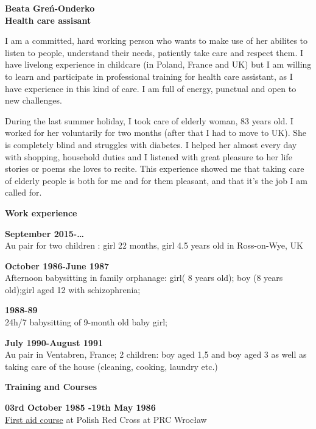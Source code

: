 \documentclass[a4paper,12pt,final]{memoir}
\newcommand{\SmallSep}{\vspace{0.5em}}
\newenvironment{Career Profile}
	{\ignorespaces\textbf{\color{ForestGreen} Career Profile}}
	{\Sep\ignorespacesafterend}
\newenvironment{Key experience}
	{\ignorespaces\textbf{\color{ForestGreen} Key experience}}
	{\Sep\ignorespacesafterend}
\newcommand{\CVSection}[1]
	{\Large\textbf{#1}\par
	\SmallSep\normalsize\normalfont}
\newcommand{\CVItem}[1]
	{\textbf{\color{ForestGreen} #1}}
\begin{document}
\Huge\bfseries {\color{ForestGreen} Beata Greń-Onderko} \\
\Large\bfseries  Health care assisant \\

\normalsize\normalfont

\begin{Career Profile} 
I am a committed, hard working person who wants to make use of her abilites to listen to people, understand their needs, patiently take care and respect them. 
I have livelong experience in childcare (in Poland, France and UK) but I am willing to learn and participate in professional training for health care assistant, as I have experience in this kind of care.
I am full of energy, punctual and open to new challenges.
\end{Career Profile}

\begin{Key experience}
During the last summer holiday, I took care of elderly woman, 83 years old. I worked for her voluntarily for two months (after that I had to move to UK). She is completely blind and struggles with diabetes. I helped her almost every day with shopping, household duties and  I listened with great pleasure to her life stories or poems she loves to recite. This experience showed me that taking care of elderly people is both for me and for them pleasant, and that it's the job I am called for. 
\end{Key experience}

\CVSection{Work experience}

\CVItem{September 2015-…}\\
Au pair for two children : girl 22 months, girl 4.5 years old in Ross-on-Wye, UK
\SmallSep

\CVItem{October 1986-June 1987}\\
Afternoon babysitting in family orphanage: girl( 8 years old); boy (8 years old);girl aged 12 with schizophrenia;
\SmallSep

\CVItem{1988-89}\\
24h/7 babysitting of 9-month old baby girl; 
\SmallSep

\CVItem{July 1990-August 1991}\\
Au pair in Ventabren, France; 2 children: boy aged 1,5 and boy aged 3 as well as taking care of the house (cleaning, cooking, laundry etc.)
\SmallSep

\CVSection{Training and Courses}
\CVItem{ 03rd October 1985 -19th May 1986}\\
\underline{First aid course} at Polish Red Cross at PRC Wrocław
\SmallSep
\end{document}
